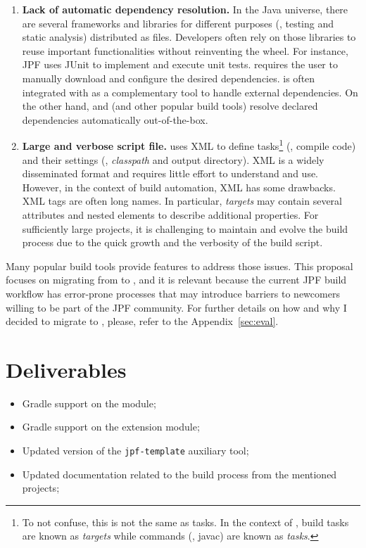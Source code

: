 \documentclass{article}
\begin{document}
\begin{enumerate}

\item \textbf{Lack of automatic dependency resolution.}
In the Java universe, there are several frameworks and libraries for different
purposes (\eg, testing and static analysis) distributed as \jar{} files.
Developers often rely on those libraries to reuse important functionalities
without reinventing the wheel.
For instance, JPF uses JUnit to implement and execute unit tests.
\ant{} requires the user to manually download and configure the desired
dependencies.
\ant{} is often integrated with \ivy{}\cite{page:ivy} as a complementary
tool to handle external dependencies.
On the other hand, \gradle{} and \maven{} (and other popular build tools)
resolve declared dependencies automatically out-of-the-box.

\item \textbf{Large and verbose script file.}
\ant{} uses XML to define tasks\footnote{To not confuse, this is not the same
as \ant{} tasks. In the context of \ant{}, build tasks are known as
\emph{targets} while commands (\eg, javac) are known as \emph{tasks}.} (\eg,
compile code) and their settings (\eg, \emph{classpath} and output directory).
XML is a widely disseminated format and requires little effort to understand
and use.
However, in the context of build automation, XML has some drawbacks.
XML tags are often long names.
In particular, \ant{} \emph{targets} may contain several attributes and nested
elements to describe additional properties.
For sufficiently large projects, it is challenging to maintain and evolve the
build process due to the quick growth and the verbosity of the build script.

\end{enumerate}

Many popular build tools provide features to address those issues.
This proposal focuses on migrating from \ant{} to \gradle{}, and it is relevant
because the current JPF build workflow has error-prone processes that may
introduce barriers to newcomers willing to be part of the JPF community.
For further details on how and why I decided to migrate to \gradle{}, please,
refer to the Appendix~\ref{sec:eval}.

\section{Deliverables}
\label{sec:deliv}

\begin{itemize}
\item Gradle support on the \jpfcore{} module;
\item Gradle support on the \jpfsymbc{} extension module;
\item Updated version of the \texttt{jpf-template} auxiliary tool; 
\item Updated documentation related to the build process from the mentioned
projects;
\end{itemize}
\end{document}
